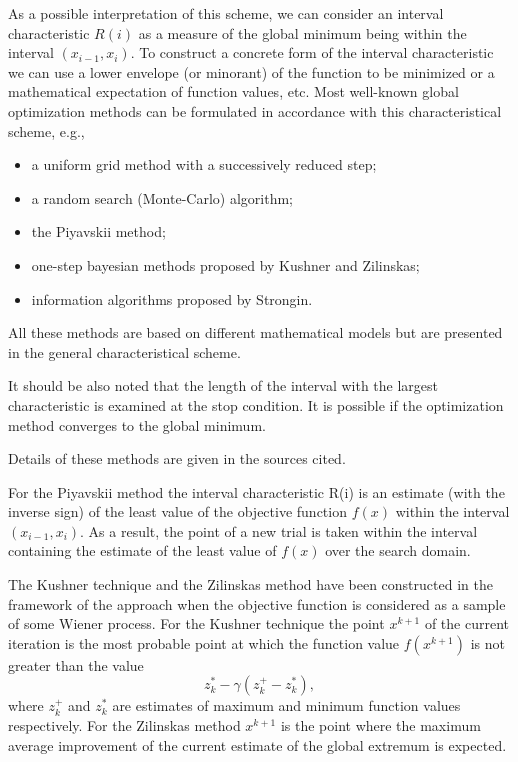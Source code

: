 \documentclass{svproc}
\begin{document}
As a possible interpretation of this scheme, we can consider an interval characteristic $R(i)$ as a measure of the global minimum being within the interval
$(x_{i-1},x_i)$.
To construct a concrete form of the interval characteristic we can use a lower envelope (or minorant) of the function to be minimized or a mathematical expectation of function values, etc. 
Most well-known global optimization methods can be formulated in accordance with this characteristical scheme, e.g.,
\begin{itemize}
\item a uniform grid method with a successively reduced step;
\item a random search (Monte-Carlo) algorithm;
\item the Piyavskii method;
\item one-step bayesian methods proposed by Kushner and Zilinskas;
\item information algorithms proposed by Strongin.
\end{itemize}
All these methods are based on different mathematical models but are presented in the general characteristical scheme.

It should be also noted that the length of the interval with the largest characteristic is examined at the stop condition.
It is possible if the optimization method converges to the global minimum.

Details of these methods are given in the sources cited. %

For the Piyavskii method the interval characteristic R(i) is an estimate (with the inverse sign) of the least value of the objective function $f(x)$ within the
interval $(x_{i-1},x_i)$. As a result, the point of a new trial is taken within the interval containing the estimate of the least value of $f(x)$ over the search domain.

The Kushner technique and the Zilinskas method have been constructed in the framework of the approach when the objective function is considered as
a sample of some Wiener process. For the Kushner technique the point $x^{k+1}$ of the current iteration is the most probable point at which the function value
$f(x^{k+1})$ is not greater than the value
\[
z_k^* -\gamma (z_k^+-z_k^*),
\]
where $z_k^+$ and $z_k^*$ are estimates of maximum and minimum function values respectively. For the Zilinskas method $x^{k+1}$ is the point where the maximum average improvement of the current estimate of the global extremum is expected.
\end{document}
